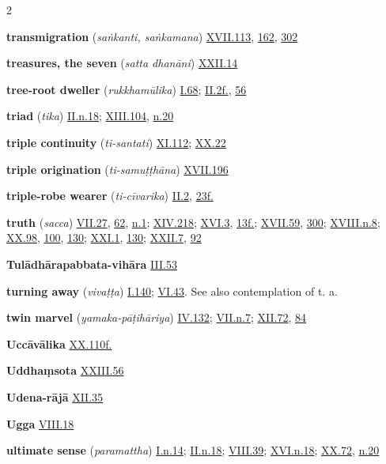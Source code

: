 \begin{multicols}{2}
\begin{vismHanging}
\par\textbf{transmigration} (\emph{saṅkanti, saṅkamana}) \hyperlink{XVII.113}{XVII.113}{}, \hyperlink{XVII.162}{162}{}, \hyperlink{XVII.302}{302}{}
\par\textbf{treasures, the seven} (\emph{satta dhanāni}) \hyperlink{XXII.14}{XXII.14}{}
\par\textbf{tree-root dweller} (\emph{rukkhamūlika}) \hyperlink{I.68}{I.68}{}; \hyperlink{II.2}{II.2f.}{}, \hyperlink{II.56}{56}{}
\par\textbf{triad} (\emph{tika}) \hyperlink{II.n18}{II.n.18}{}; \hyperlink{XIII.104}{XIII.104}{}, \hyperlink{XIII.n20}{n.20}{}
\par\textbf{triple continuity} (\emph{ti-santati}) \hyperlink{XI.112}{XI.112}{}; \hyperlink{XX.22}{XX.22}{}
\par\textbf{triple origination} (\emph{ti-samuṭṭhāna}) \hyperlink{XVII.196}{XVII.196}{}
\par\textbf{triple-robe wearer} (\emph{ti-cīvarika}) \hyperlink{II.2}{II.2}{}, \hyperlink{II.23}{23f.}{}
\par\textbf{truth} (\emph{sacca}) \hyperlink{VII.27}{VII.27}{}, \hyperlink{VII.62}{62}{}, \hyperlink{VII.n1}{n.1}{}; \hyperlink{XIV.218}{XIV.218}{}; \hyperlink{XVI.3}{XVI.3}{}, \hyperlink{XVI.13}{13f.}{}; \hyperlink{XVII.59}{XVII.59}{}, \hyperlink{XVII.300}{300}{}; \hyperlink{XVIII.n8}{XVIII.n.8}{}; \hyperlink{XX.98}{XX.98}{}, \hyperlink{XX.100}{100}{}, \hyperlink{XX.130}{130}{}; \hyperlink{XXI.1}{XXI.1}{}, \hyperlink{XXI.130}{130}{}; \hyperlink{XXII.7}{XXII.7}{}, \hyperlink{XXII.92}{92}{}
\par\textbf{Tulādhārapabbata-vihāra} \hyperlink{III.53}{III.53}{}
\par\textbf{turning away} (\emph{vivaṭṭa}) \hyperlink{I.140}{I.140}{}; \hyperlink{VI.43}{VI.43}{}. See also contemplation of t. a. 
\par\textbf{twin marvel} (\emph{yamaka-pāṭihāriya}) \hyperlink{IV.132}{IV.132}{}; \hyperlink{VII.n7}{VII.n.7}{}; \hyperlink{XII.72}{XII.72}{}, \hyperlink{XII.84}{84}{}
\par\textbf{Uccāvālika} \hyperlink{XX.110}{XX.110f.}{}
\par\textbf{Uddhaṃsota} \hyperlink{XXIII.56}{XXIII.56}{}
\par\textbf{Udena-rājā} \hyperlink{XII.35}{XII.35}{}
\par\textbf{Ugga} \hyperlink{VIII.18}{VIII.18}{}
\par\textbf{ultimate sense} (\emph{paramattha}) \hyperlink{I.n14}{I.n.14}{}; \hyperlink{II.n18}{II.n.18}{}; \hyperlink{VIII.39}{VIII.39}{}; \hyperlink{XVI.n18}{XVI.n.18}{}; \hyperlink{XX.72}{XX.72}{}, \hyperlink{XX.n20}{n.20}{}

\end{vismHanging}
\end{multicols}
